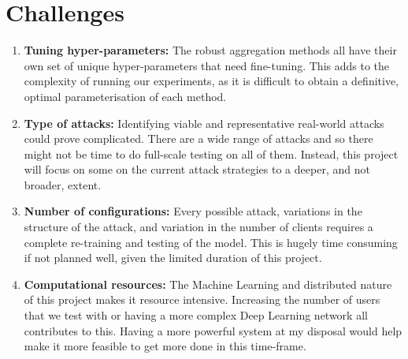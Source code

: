 \section{Challenges}
\begin{enumerate}
    \item \textbf{Tuning hyper-parameters:} 
    The robust aggregation methods all have their own set of unique hyper-parameters that need fine-tuning. This adds to the complexity of running our experiments, as it is difficult to obtain a definitive, optimal parameterisation of each method.
        
    \item \textbf{Type of attacks:} 
    Identifying viable and representative real-world attacks could prove complicated. 
    There are a wide range of attacks and so there might not be time to do full-scale testing on all of them.
    Instead, this project will focus on some on the current attack strategies to a deeper, and not broader, extent.

    \item \textbf{Number of configurations:}  
    Every possible attack, variations in the structure of the attack, and variation in the number of clients requires a complete re-training and testing of the model. 
    This is hugely time consuming if not planned well, given the limited duration of this project.
    
    \item \textbf{Computational resources:}
    The Machine Learning and distributed nature of this project makes it resource intensive. 
    Increasing the number of users that we test with or having a more complex Deep Learning network all contributes to this.
    Having a more powerful system at my disposal would help make it more feasible to get more done in this time-frame.
\end{enumerate}

